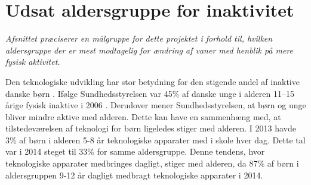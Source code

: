 \section {Udsat aldersgruppe for inaktivitet} \label{sec:maalgruppe}
\textit{Afsnittet præciserer en målgruppe for dette projektet i forhold til, hvilken aldersgruppe der er mest modtagelig for ændring af vaner med henblik på mere fysisk aktivitet.}

Den teknologiske udvikling har stor betydning for den stigende andel af inaktive danske børn %
\citep{Kiens2007}. Ifølge Sundhedsstyrelsen var 45\% af danske unge i alderen 11–15 årige fysisk inaktive i 2006 \citep{Sundhedsstyrelsen2006}. Derudover mener Sundhedsstyrelsen, at børn og unge bliver mindre aktive med alderen. Dette kan have en sammenhæng med, at tilstedeværelsen af teknologi for børn ligeledes stiger med alderen. %
I 2013 havde 3\% af børn i alderen 5-8 år teknologiske apparater med i skole hver dag. Dette tal var i 2014 steget til 33\% for samme aldersgruppe. Denne tendens, hvor teknologiske apparater medbringes dagligt, stiger med alderen, da 87\% af børn i aldersgruppen 9-12 år dagligt medbragt teknologiske apparater i 2014. \citep{Sundhedsstyrelsen2006,GjensidigeForsikring2014} 

